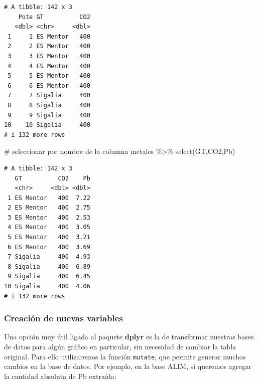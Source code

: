 \documentclass[
  letterpaper,
  DIV=11,
  numbers=noendperiod]{scrartcl}
\newenvironment{Shaded}{\begin{snugshade}}{\end{snugshade}}
\newcommand{\CommentTok}[1]{\textcolor[rgb]{0.37,0.37,0.37}{#1}}
\newcommand{\FunctionTok}[1]{\textcolor[rgb]{0.28,0.35,0.67}{#1}}
\newcommand{\NormalTok}[1]{\textcolor[rgb]{0.00,0.23,0.31}{#1}}
\newcommand{\OtherTok}[1]{\textcolor[rgb]{0.00,0.23,0.31}{#1}}
\newcommand{\SpecialCharTok}[1]{\textcolor[rgb]{0.37,0.37,0.37}{#1}}
\newcommand{\StringTok}[1]{\textcolor[rgb]{0.13,0.47,0.30}{#1}}
\begin{document}
\begin{verbatim}
# A tibble: 142 x 3
    Pote GT          CO2
   <dbl> <chr>     <dbl>
 1     1 ES Mentor   400
 2     2 ES Mentor   400
 3     3 ES Mentor   400
 4     4 ES Mentor   400
 5     5 ES Mentor   400
 6     6 ES Mentor   400
 7     7 Sigalia     400
 8     8 Sigalia     400
 9     9 Sigalia     400
10    10 Sigalia     400
# i 132 more rows
\end{verbatim}

\begin{Shaded}
\begin{Highlighting}[]
\CommentTok{\# seleccionar por nombre de la columna}
\NormalTok{metales }\SpecialCharTok{\%\textgreater{}\%} \FunctionTok{select}\NormalTok{(GT,CO2,Pb)}
\end{Highlighting}
\end{Shaded}

\begin{verbatim}
# A tibble: 142 x 3
   GT          CO2    Pb
   <chr>     <dbl> <dbl>
 1 ES Mentor   400  7.22
 2 ES Mentor   400  2.75
 3 ES Mentor   400  2.53
 4 ES Mentor   400  3.05
 5 ES Mentor   400  3.21
 6 ES Mentor   400  3.69
 7 Sigalia     400  4.93
 8 Sigalia     400  6.89
 9 Sigalia     400  6.45
10 Sigalia     400  4.06
# i 132 more rows
\end{verbatim}

\hypertarget{creaciuxf3n-de-nuevas-variables}{%
\subsubsection{Creación de nuevas
variables}\label{creaciuxf3n-de-nuevas-variables}}

Una opción muy útil ligada al paquete \textbf{dplyr} es la de
transformar nuestras bases de datos para algún gráfico en particular,
sin necesidad de cambiar la tabla original. Para ello utilizaremos la
función \texttt{mutate}, que permite generar muchos cambios en la base
de datos. Por ejemplo, en la base ALIM, si queremos agregar la cantidad
absoluta de Pb extraída:

\begin{Shaded}
\end{Shaded}
\end{document}
